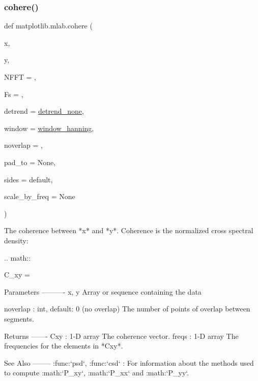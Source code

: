 \subsubsection{\texorpdfstring{cohere()}{cohere()}}
{\footnotesize\ttfamily def matplotlib.\+mlab.\+cohere (\begin{DoxyParamCaption}\item[{}]{x,  }\item[{}]{y,  }\item[{}]{N\+F\+FT = {},  }\item[{}]{Fs = {},  }\item[{}]{detrend = {\ttfamily \hyperlink{namespacematplotlib_1_1mlab_a359979aa8e0e635738648ca88ebd5e1d}{detrend\+\_\+none}},  }\item[{}]{window = {\ttfamily \hyperlink{namespacematplotlib_1_1mlab_a0be4c7ab27102a4d8ceb0a08a32ac0fc}{window\+\_\+hanning}},  }\item[{}]{noverlap = {},  }\item[{}]{pad\+\_\+to = {\ttfamily None},  }\item[{}]{sides = {\ttfamily \textquotesingle{}default\textquotesingle{}},  }\item[{}]{scale\+\_\+by\+\_\+freq = {\ttfamily None} }\end{DoxyParamCaption})}

\begin{DoxyVerb}The coherence between *x* and *y*.  Coherence is the normalized
cross spectral density:

.. math::

    C_{xy} = 

Parameters
----------
x, y
    Array or sequence containing the data



noverlap : int, default: 0 (no overlap)
    The number of points of overlap between segments.

Returns
-------
Cxy : 1-D array
    The coherence vector.
freqs : 1-D array
        The frequencies for the elements in *Cxy*.

See Also
--------
:func:`psd`, :func:`csd` :
    For information about the methods used to compute :math:`P_{xy}`,
    :math:`P_{xx}` and :math:`P_{yy}`.
\end{DoxyVerb}
 \mbox{\label{namespacematplotlib_1_1mlab_af5c09befd987c2d0090be90434de805a}} 
